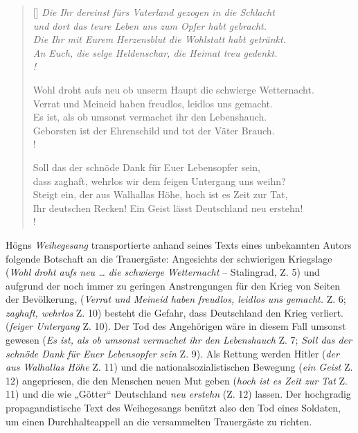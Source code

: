 \documentclass{book}
\begin{document}
\settowidth{\versewidth}{Wohl droht aufs neu ob unserm Haupt die schwierge Wetternacht.}
\begin{verse}[\versewidth]
\itshape
Die Ihr dereinst fürs Vaterland gezogen in die Schlacht \\
und dort das teure Leben uns zum Opfer habt gebracht. \\
Die Ihr mit Eurem Herzensblut die Wohlstatt habt getränkt. \\
An Euch, die selge Heldenschar, die Heimat treu gedenkt. \\!

Wohl droht aufs neu ob unserm Haupt die schwierge Wetternacht. \\
Verrat und Meineid haben freudlos, leidlos uns gemacht. \\
Es ist, als ob umsonst vermachet ihr den Lebenshauch. \\
Geborsten ist der Ehrenschild und tot der Väter Brauch. \\!

Soll das der schnöde Dank für Euer Lebensopfer sein, \\
dass zaghaft, wehrlos wir dem feigen Untergang uns weihn? \\
Steigt ein, der aus Walhallas Höhe, hoch ist es Zeit zur Tat, \\
Ihr deutschen Recken! Ein Geist lässt Deutschland neu erstehn! \\!
\end{verse}

Högns \textit{Weihegesang} transportierte anhand seines Texts eines
unbekannten Au\-tors folgende Botschaft an die Trauergäste: Angesichts
der schwierigen Kriegslage (\textit{Wohl droht aufs neu … die schwierge
Wetternacht} – Stalingrad, Z. 5) und aufgrund der noch immer zu
geringen Anstrengungen für den Krieg von Seiten der Bevölkerung,
(\textit{Verrat und Meineid haben freudlos, leidlos uns gemacht.} Z. 6;
\textit{zaghaft, wehrlos} Z. 10) besteht die Gefahr, dass Deutschland
den Krieg ver\-liert. (\textit{feiger Untergang} Z. 10). Der Tod des
Angehörigen wäre in diesem Fall um\-sonst gewesen (\textit{Es ist, als
ob umsonst vermachet ihr den Lebenshauch} Z. 7; \textit{Soll das der
schnöde Dank für Euer Lebensopfer sein} Z. 9). Als Rettung werden
Hitler (\textit{der aus Walhallas Höhe} Z. 11) und die
nationalsozialistischen Bewegung (\textit{ein Geist} Z. 12)
angepriesen, die den Menschen neuen Mut geben (\textit{hoch ist es Zeit
zur Tat} Z. 11) und die wie „Götter“ Deutschland \textit{neu erstehn}
(Z. 12) lassen. Der hochgra\-dig propagandistische Text des
Weihegesangs benützt also den Tod eines Sol\-daten, um einen
Durchhalteappell an die versammelten Trauergäste zu rich\-ten.
\end{document}
